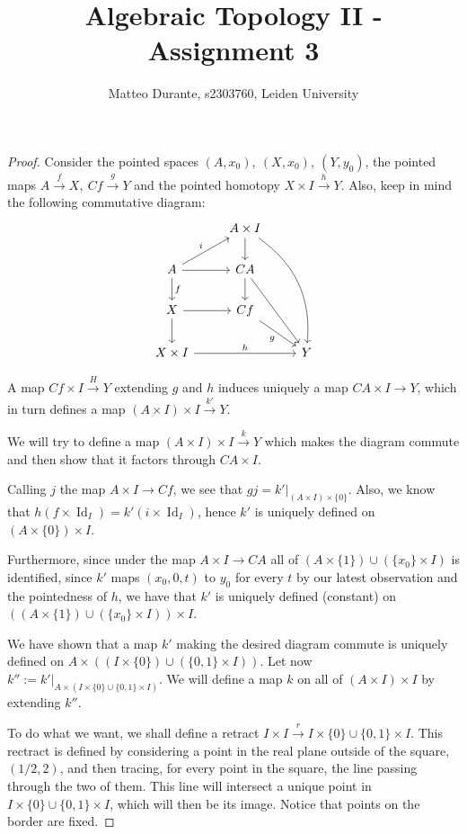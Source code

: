 \documentclass{article}
\newcommand{\exercise}[1]{\noindent {\bf Exercise #1}}
\DeclareMathOperator{\Id}{Id}
\begin{document}
\title{Algebraic Topology II - Assignment 3}

\author{Matteo Durante, s2303760, Leiden University}

\maketitle

\exercise{2}

\begin{proof}
	Consider the pointed spaces $(A,x_0),\ (X,x_0),\ (Y,y_0)$, the pointed maps $A\xrightarrow{f}X,\ Cf\xrightarrow{g} Y$ and the pointed homotopy $X\times I\xrightarrow{h} Y$. Also, keep in mind the following commutative diagram:
	\[
		\begin{tikzcd}
			& A\times I\arrow{d}\arrow[bend left]{dddr} \\
			A\arrow{ur}{i}\arrow{r}\arrow{d}{f}
			& CA\arrow{ddr}\arrow{d} \\
			X\arrow{r}\arrow{d}
			& Cf\arrow[swap]{dr}{g} \\
			X\times I\arrow{rr}{h}
			&& Y
		\end{tikzcd}
	\]
	
	A map $Cf\times I\xrightarrow{H}Y$ extending $g$ and $h$ induces uniquely a map $CA\times I\rightarrow Y$, which in turn defines a map $(A\times I)\times I\xrightarrow{k'} Y$.
	
	We will try to define a map $(A\times I)\times I\xrightarrow{k} Y$ which makes the diagram commute and then show that it factors through $CA\times I$.
	
	Calling $j$ the map $A\times I\rightarrow Cf$, we see that $gj=k'|_{(A\times I)\times\{0\}}$. Also, we know that $h(f\times \Id_I)=k'(i\times\Id_I)$, hence $k'$ is uniquely defined on $(A\times\{0\})\times I$.
	
	Furthermore, since under the map $A\times I\rightarrow CA$ all of $(A\times\{1\})\cup(\{x_0\}\times I)$ is identified, since $k'$ maps $(x_0,0,t)$ to $y_0$ for every $t$ by our latest observation and the pointedness of $h$, we have that $k'$ is uniquely defined (constant) on $((A\times\{1\})\cup(\{x_0\}\times I))\times I$.
	
	We have shown that a map $k'$ making the desired diagram commute is uniquely defined on $A\times((I\times\{0\})\cup(\{0,1\}\times I))$. Let now $k'':=k'|_{A\times(I\times\{0\}\cup\{0,1\}\times I)}$. We will define a map $k$ on all of $(A\times I)\times I$ by extending $k''$.
	
	To do what we want, we shall define a retract $I\times I\xrightarrow{r} I\times\{0\}\cup\{0,1\}\times I$. This rectract is defined by considering a point in the real plane outside of the square, $(1/2,2)$, and then tracing, for every point in the square, the line passing through the two of them. This line will intersect a unique point in $I\times\{0\}\cup\{0,1\}\times I$, which will then be its image. Notice that points on the border are fixed.


\end{proof}
\end{document}
